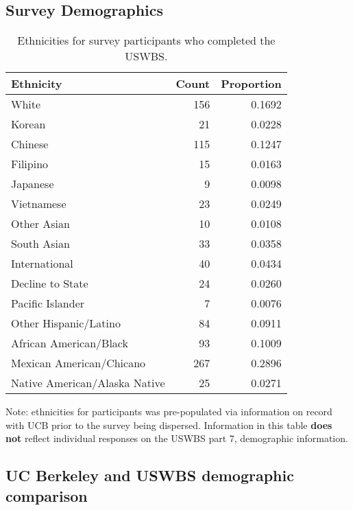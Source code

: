 \documentclass{article}\usepackage[]{graphicx}\usepackage[]{color}
\begin{document}
\subsection{Survey Demographics}
 
\begin{table}[ht]
\centering
\begin{tabular}{lrr}
  \hline
Ethnicity & Count & Proportion \\ 
  \hline
                         White & 156 & 0.1692 \\ 
                          Korean & 21 & 0.0228 \\ 
                         Chinese & 115 & 0.1247 \\ 
                        Filipino & 15 & 0.0163 \\ 
                        Japanese & 9 & 0.0098 \\ 
                      Vietnamese & 23 & 0.0249 \\ 
                     Other Asian & 10 & 0.0108 \\ 
                     South Asian & 33 & 0.0358 \\ 
                   International & 40 & 0.0434 \\ 
                Decline to State & 24 & 0.0260 \\ 
                Pacific Islander & 7 & 0.0076 \\ 
           Other Hispanic/Latino & 84 & 0.0911 \\ 
          African American/Black & 93 & 0.1009 \\ 
        Mexican American/Chicano & 267 & 0.2896 \\ 
   Native American/Alaska Native & 25 & 0.0271 \\ 
   \hline
\end{tabular}
\caption{Ethnicities for survey participants who completed the USWBS.} 
\end{table}


Note: ethnicities for participants was pre-populated via information on record with UCB prior to the survey being dispersed. Information in this table \textbf{does not} reflect individual responses on the USWBS part 7, demographic information.

\subsection{UC Berkeley and USWBS demographic comparison}
\end{document}
